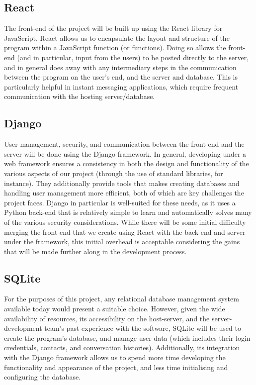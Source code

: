 \documentclass[11pt]{article}
\begin{document}
\subsection{React}
The front-end of the project will be built up using the React library for JavaScript. React
allows us to encapsulate the layout and structure of the program within a JavaScript function (or
functions). Doing so allows the front-end (and in particular, input from the users) to be posted
directly to the server, and in general does away with any intermediary steps in the communication
between the program on the user's end, and the server and database. This is particularly helpful in
instant messaging applications, which require frequent communication with the hosting
server/database.

\subsection{Django}
User-management, security, and communication between the front-end and the server will be done using
the Django framework. In general, developing under a web framework ensures a consistency in both the
design and functionality of the various aspects of our project (through the use of standard
libraries, for instance). They additionally provide tools that makes creating databases and handling
user management more efficient, both of which are key challenges the project faces. Django in
particular is well-suited for these needs, as it uses a Python back-end that is relatively simple to
learn and automatically solves many of the various security considerations. While there will be some
initial difficulty merging the front-end that we create using React with the back-end and server
under the framework, this initial overhead is acceptable considering the gains that will be made
further along in the development process.

\subsection{SQLite}
For the purposes of this project, any relational database management system available today would
present a suitable choice. However, given the wide availability of resources, its accessibility on
the host-server, and the server-development team's past experience with the software, SQLite will be
used to create the program's database, and manage user-data (which includes their login credentials,
contacts, and conversation histories). Additionally, its integration with the Django framework
allows us to spend more time developing the functionality and appearance of the project, and less
time initialising and configuring the database.
\end{document}
